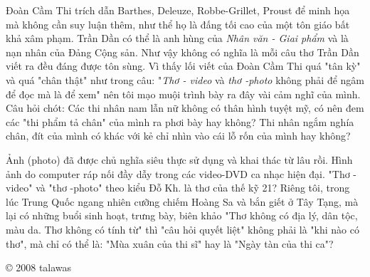 \documentclass[../main.tex]{subfiles}
\begin{document}
\begin{multicols}{2}
Đoàn Cầm Thi trích dẫn Barthes, Deleuze, Robbe-Grillet, Proust để minh họa mà không cần suy luận thêm, như thể họ là đấng tối cao của một tôn giáo bất khả xâm phạm. Trần Dần có thể là anh hùng của \textit{Nhân văn - Giai phẩm} và là nạn nhân của Đảng Cộng sản. Như vậy không có nghĩa là mỗi câu thơ Trần Dần viết ra đều đáng được tôn sùng. Vì thấy lối viết của Đoàn Cầm Thi quá "tân kỳ" và quá "chân thật" như trong câu: "\textit{Thơ - video} và \textit{thơ -photo} không phải để ngâm để đọc mà là để xem" nên tôi mạo muội trình bày ra đây vài cảm nghĩ của mình. Câu hỏi chót: Các thi nhân nam lẫn nữ không có thân hình tuyệt mỹ, có nên đem các "thi phẩm tả chân" của mình ra phơi bày hay không? Thi nhân ngắm nghía chân, đít của mình có khác với kẻ chỉ nhìn vào cái lỗ rốn của mình hay không?  
 
Ảnh (photo) đã được chủ nghĩa siêu thực sử dụng và khai thác từ lâu rồi. Hình ảnh do computer ráp nối đầy dẫy trong các video-DVD ca nhạc hiện đại. "Thơ - video" và "thơ -photo" theo kiểu Đỗ Kh. là thơ của thế kỹ 21? Riêng tôi, trong lúc Trung Quốc ngang nhiên cưỡng chiếm Hoàng Sa và bắn giết ở Tây Tạng, mà lại có những buổi sinh hoạt, trưng bày, biên khảo "Thơ không có địa lý, dân tộc, màu da. Thơ không có tính từ" thì "câu hỏi quyết liệt" không phải là "khi nào có thơ", mà chỉ có thể là: "Mùa xuân của thi sĩ" hay là "Ngày tàn của thi ca"? 
 
© 2008 talawas 
\end{multicols}
\end{document}
